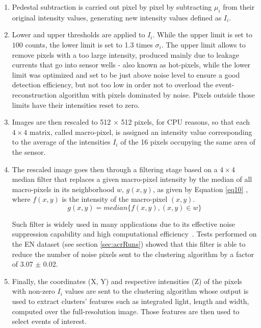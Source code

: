 \documentclass[a4paper,11pt]{article}
\begin{document}
\begin{enumerate}
\addtocounter{enumi}{0}
    
    \item Pedestal subtraction is carried out pixel by pixel by subtracting $\mu_i$ from their original intensity values, generating new intensity values defined as $I_i$. 

    \item Lower and upper thresholds are applied to $I_i$.
    While the upper limit is set to $100$ counts, the lower limit is set to 1.3 times $\sigma_i$.
    The upper limit allows to remove pixels with a too large intensity, produced mainly due to leakage currents that go into sensor wells - also known as hot-pixels, while the lower limit was optimized and set to be just above noise level to ensure a good detection efficiency, but not too low in order not to overload the event-reconstruction algorithm with pixels dominated by noise. Pixels outside those limits have their intensities reset to zero.
    
    
    \item Images are then rescaled to 512 $\times$ 512 pixels, for CPU reasons, so that each $4 \times 4$ matrix, called macro-pixel, is assigned an intensity value corresponding to the average of the intensities $I_i$ of the 16 pixels occupying the same area of the sensor. %
    
    \item The rescaled image goes then through a filtering stage based on a $4 \times 4$ median filter that replaces a given macro-pixel intensity by the median of all macro-pixels in its neighborhood $w$, $g(x,y)$, as given by Equation \ref{eq10} \cite{filterStudy}, where $f(x,y)$ is the intensity of the macro-pixel $(x,y)$.
        \begin{equation}
             g(x,y) = median\{f(x,y), (x,y) \in w\}
             \label{eq10}
         \end{equation}
        
    Such filter is widely used in many applications due to its effective noise suppression capability and high computational efficiency~\cite{gonzalez2002digital}.
    Tests performed on the EN dataset (see section \ref{sec:acrRuns}) showed that this filter is able to reduce the number of noise pixels sent to the clustering algorithm by a factor of 3.07 $\pm$ 0.02.
 
    
    \item Finally, the coordinates (X, Y) and respective intensities (Z) of the pixels with non-zero $I_i$ values are sent to the clustering algorithm whose output is used to extract clusters' features such as integrated light, length and width, computed over the full-resolution image. Those features are then used to select events of interest. 
\end{enumerate}
\end{document}
